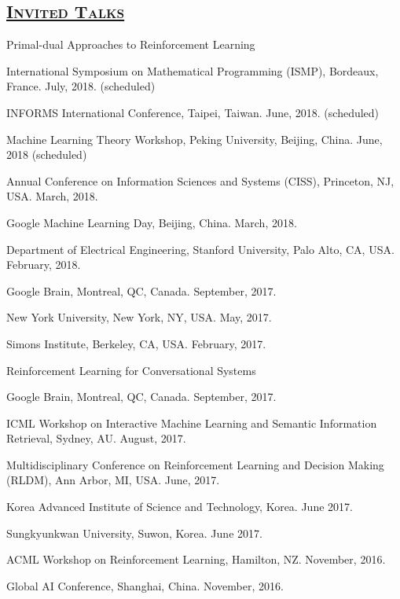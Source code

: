 \documentclass[10pt,twoside,letterpaper]{article}
\begin{document}
\subsection*{\textsc{\underline{Invited Talks}}}

\begin{compactitem}

\item{Primal-dual Approaches to Reinforcement Learning}
\begin{compactitem}
\item{International Symposium on Mathematical Programming (ISMP), Bordeaux, France. July, 2018. (scheduled)}
\item{INFORMS International Conference, Taipei, Taiwan. June, 2018. (scheduled)}
\item{Machine Learning Theory Workshop, Peking University, Beijing, China.  June, 2018 (scheduled)}
\item{Annual Conference on Information Sciences and Systems (CISS), Princeton, NJ, USA. March, 2018.}
\item{Google Machine Learning Day, Beijing, China. March, 2018.}
\item{Department of Electrical Engineering, Stanford University, Palo Alto, CA, USA. February, 2018.}
\item{Google Brain, Montreal, QC, Canada.  September, 2017.}
\item{New York University, New York, NY, USA.  May, 2017.}
\item{Simons Institute, Berkeley, CA, USA.  February, 2017.}
\end{compactitem}

\item{Reinforcement Learning for Conversational Systems}
\begin{compactitem}
\item{Google Brain, Montreal, QC, Canada.  September, 2017.}
\item{ICML Workshop on Interactive Machine Learning and Semantic Information Retrieval, Sydney, AU.  August, 2017.}
\item{Multidisciplinary Conference on Reinforcement Learning and Decision Making (RLDM), Ann Arbor, MI, USA.  June, 2017.}
\item{Korea Advanced Institute of Science and Technology, Korea. June 2017.}
\item{Sungkyunkwan University, Suwon, Korea. June 2017.}
\item{ACML Workshop on Reinforcement Learning, Hamilton, NZ.  November, 2016.}
\item{Global AI Conference, Shanghai, China.  November, 2016.}
\end{compactitem}


\end{compactitem}
\end{document}
